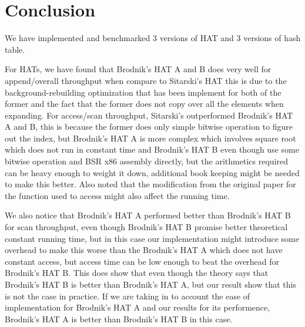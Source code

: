 \documentclass{article} %
\begin{document}
    \section*{Conclusion}
    We have implemented and benchmarked 3 versions of HAT and 3 versions of hash table.
    
    For HATs, we have found that Brodnik's HAT A and B does very well for append/overall throughput when compare to Sitarski's HAT this is due to
    the background-rebuilding optimization that has been implement for both of the former and the fact that the former does not copy over all the elements
    when expanding. For access/scan throughput, Sitarski's outperformed Brodnik's HAT A and B, this is because the former does only simple bitwise operation to figure out the index,
    but Brodnik's HAT A is more complex which involves square root which does not run in constant time and Brodnik's HAT B even though use some bitwise operation and BSR x86 assembly directly, but
    the arithmetics required can be heavy enough to weight it down, additional book keeping might be needed to make this better. Also noted that the modification from
    the original paper for the function used to access might also affect the running time.

    We also notice that Brodnik's HAT A performed better than Brodnik's HAT B for scan throughput, even though Brodnik's HAT B promise better theoretical constant running time, but in this
    case our implementation might introduce some overhead to make this worse than the Brodnik's HAT A which does not have constant access, but access time can be low enough to beat the overhead for
    Brodnik's HAT B. This does show that even though the theory says that Brodnik's HAT B is better than Brodnik's HAT A, but our result show that this is not the case in practice.
    If we are taking in to account the ease of implementation for Brodnik's HAT A and our results for its performence, Brodnik's HAT A is better than Brodnik's HAT B in this case.
\end{document}

